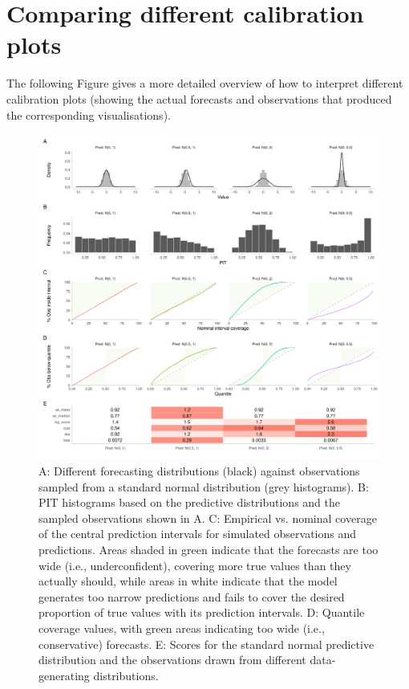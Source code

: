 \documentclass[
]{jss}
\begin{document}
\section{Comparing different calibration plots}

The following Figure gives a more detailed overview of how to interpret
different calibration plots (showing the actual forecasts and
observations that produced the corresponding visualisations).

\begin{CodeChunk}
\begin{figure}[!h]

{\centering \includegraphics[width=1\linewidth,]{output/calibration-diagnostic-examples} 

}

\caption[A]{A: Different forecasting distributions (black) against observations sampled from a standard normal distribution (grey histograms). B: PIT histograms based on the predictive distributions and the sampled observations shown in A. C: Empirical vs. nominal coverage of the central prediction intervals for simulated observations and predictions. Areas shaded in green indicate that the forecasts are too wide (i.e., underconfident), covering more true values than they actually should, while areas in white indicate that the model generates too narrow predictions and fails to cover the desired proportion of true values with its prediction intervals. D: Quantile coverage values, with green areas indicating too wide (i.e., conservative) forecasts. E: Scores for the standard normal predictive distribution and the observations drawn from different data-generating distributions.}\label{fig:calibration-plots}
\end{figure}
\end{CodeChunk}
\end{document}
